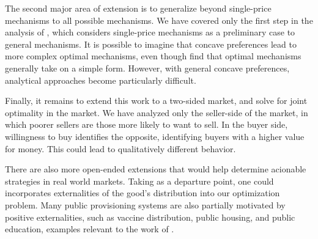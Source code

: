 \documentclass[AER]{AEA}
\begin{document}
The second major area of extension is to generalize beyond single-price mechanisms to all possible mechanisms. We have covered only the first step in the analysis of \cite{dworczak-2020}, which considers single-price mechanisms as a preliminary case to general mechanisms. It is possible to imagine that concave preferences lead to more complex optimal mechanisms, even though \cite{dworczak-2020} find that optimal mechanisms generally take on a simple form. However, with general concave preferences, analytical approaches become particularly difficult. 

Finally, it remains to extend this work to a two-sided market, and solve for joint optimality in the market. We have analyzed only the seller-side of the market, in which poorer sellers are those more likely to want to sell. In the buyer side, willingness to buy identifies the opposite, identifying buyers with a higher value for money. This could lead to qualitatively different behavior.

There are also more open-ended extensions that would help determine acionable strategies in real world markets. Taking \cite{akbarpour-2020} as a departure point, one could incorporates externalities of the good's distribution into our optimization problem. Many public provisioning systems are also partially motivated by positive externalities, such as vaccine distribution, public housing, and public education, examples relevant to the work of \cite{kang-2020}.



\end{document}
